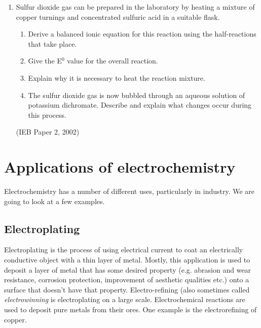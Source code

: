 {\begin{enumerate}
	\begin{enumerate}
	\item{Laboratory solutions of aqueous potassium dichromate are not acidified}
	\item{The E$^{0}$ value for this reaction is only +0.10V}
	\item{The activation energy is too low}
	\item{The reaction is non-spontaneous}
	\end{enumerate}

(IEB Paper 2, 2002)

\item{Sulfur dioxide gas can be prepared in the laboratory by heating a mixture of copper turnings and concentrated sulfuric acid in a suitable flask.}	
	\begin{enumerate}
	\item{Derive a balanced ionic equation for this reaction using the half-reactions that take place.}
	\item{Give the E$^{0}$ value for the overall reaction.}
	\item{Explain why it is necessary to heat the reaction mixture.}
	\item{The sulfur dioxide gas is now bubbled through an aqueous solution of potassium dichromate. Describe and explain what changes occur during this process.}
	\end{enumerate}
(IEB Paper 2, 2002)
\end{enumerate}


}






\section{Applications of electrochemistry}
\label{sec:electrochemical:applications}

Electrochemistry has a number of different uses, particularly in industry. We are going to look at a few examples.

\subsection{Electroplating}

Electroplating is the process of using electrical current to coat an electrically conductive object with a thin layer of metal. Mostly, this application is used to deposit a layer of metal that has some desired property (e.g. abrasion and wear resistance, corrosion protection, improvement of aesthetic qualities etc.) onto a surface that doesn't have that property. Electro-refining (also sometimes called \textit{electrowinning} is electroplating on a large scale. Electrochemical reactions are used to deposit pure metals from their ores. One example is the electrorefining of copper.\\

